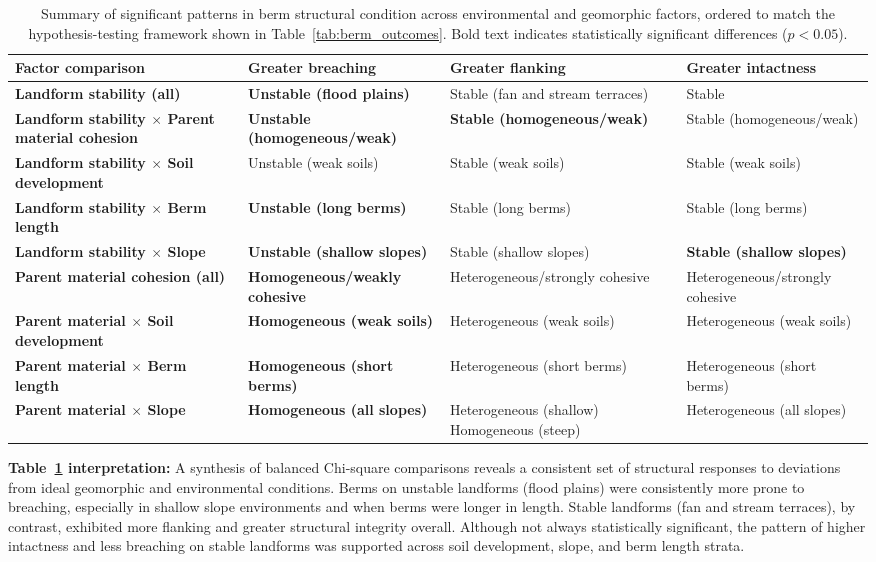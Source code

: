 \documentclass[review]{elsarticle}
\begin{document}
\begin{table}[h!]
\centering
\caption{\normalsize Summary of significant patterns in berm structural condition across environmental and geomorphic factors, ordered to match the hypothesis-testing framework shown in Table~\ref{tab:berm_outcomes}. Bold text indicates statistically significant differences ($p < 0.05$).}
\small
\begin{tabular}{|p{4.2cm}|p{3.6cm}|p{3.6cm}|p{3.6cm}|}
\hline
\textbf{Factor comparison} & \textbf{Greater breaching} & \textbf{Greater flanking} & \textbf{Greater intactness} \\
\hline
\textbf{Landform stability (all)} & \textbf{Unstable (flood plains)} & Stable (fan and stream terraces) & Stable \\
\hline
\textbf{Landform stability $\times$ Parent material cohesion} & \textbf{Unstable (homogeneous/weak)} & \textbf{Stable (homogeneous/weak)} & Stable (homogeneous/weak) \\
\hline
\textbf{Landform stability $\times$ Soil development} & Unstable (weak soils) & Stable (weak soils) & Stable (weak soils) \\
\hline
\textbf{Landform stability $\times$ Berm length} & \textbf{Unstable (long berms)} & Stable (long berms) & Stable (long berms) \\
\hline
\textbf{Landform stability $\times$ Slope} & \textbf{Unstable (shallow slopes)} & Stable (shallow slopes) & \textbf{Stable (shallow slopes)} \\
\hline
\textbf{Parent material cohesion (all)} & \textbf{Homogeneous/weakly cohesive} & Heterogeneous/strongly cohesive & Heterogeneous/strongly cohesive \\
\hline
\textbf{Parent material $\times$ Soil development} & \textbf{Homogeneous (weak soils)} & Heterogeneous (weak soils) & Heterogeneous (weak soils) \\
\hline
\textbf{Parent material $\times$ Berm length} & \textbf{Homogeneous (short berms)} & Heterogeneous (short berms) & Heterogeneous (short berms) \\
\hline
\textbf{Parent material $\times$ Slope} & \textbf{Homogeneous (all slopes)} & Heterogeneous (shallow) \newline Homogeneous (steep) & Heterogeneous (all slopes) \\
\hline
\end{tabular}
\label{tab:multi_factor_summary}
\end{table}

\textbf{Table~\ref{tab:multi_factor_summary} interpretation:} A synthesis of balanced Chi-square comparisons reveals a consistent set of structural responses to deviations from ideal geomorphic and environmental conditions. Berms on unstable landforms (flood plains) were consistently more prone to breaching, especially in shallow slope environments and when berms were longer in length. Stable landforms (fan and stream terraces), by contrast, exhibited more flanking and greater structural integrity overall. Although not always statistically significant, the pattern of higher intactness and less breaching on stable landforms was supported across soil development, slope, and berm length strata.
\end{document}
